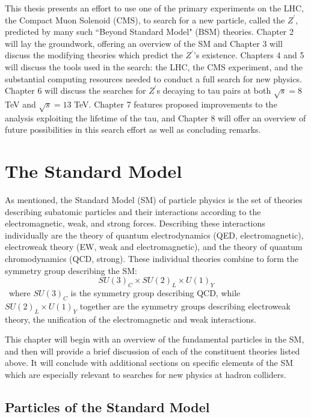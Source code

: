 This thesis presents an effort to use one of the primary experiments on the LHC, the Compact Muon Solenoid (CMS), to search for a new particle, called the \emph{$Z^\prime$}, predicted by many such ``Beyond Standard Model" (BSM) theories. Chapter 2 will lay the groundwork, offering an overview of the SM and Chapter 3 will discuss the modifying theories which predict the $Z^\prime$'s existence. Chapters 4 and 5 will discuss the tools used in the search: the LHC, the CMS experiment, and the substantial computing resources needed to conduct a full search for new physics. Chapter 6 will discuss the searches for $Z^\prime$s decaying to tau pairs at both $\sqrt{s} = 8$ TeV and $\sqrt{s} = 13$ TeV. Chapter 7 features proposed improvements to the analysis exploiting the lifetime of the tau, and Chapter 8 will offer an overview of future possibilities in this search effort as well as concluding remarks.
\clearpage

\chapter{The Standard Model}


As mentioned, the Standard Model (SM) of particle physics is the set of theories describing subatomic particles and their interactions according to the electromagnetic, weak, and strong forces. Describing these interactions individually are the theory of quantum electrodynamics (QED, electromagnetic), electroweak theory (EW, weak and electromagnetic), and the theory of quantum chromodynamics (QCD, strong). These individual theories combine to form the symmetry group describing the SM:
\begin{equation}
SU(3)_{C} \times SU(2)_{L} \times U(1)_{Y}
\end{equation}
\noindent\ where $SU(3)_{C}$ is the symmetry group describing QCD, while $SU(2)_{L} \times U(1)_{Y}$ together are the symmetry groups describing electroweak theory, the unification of the electromagnetic and weak interactions.

This chapter will begin with an overview of the fundamental particles in the SM, and then will provide a brief discussion of each of the constituent theories listed above. It will conclude with additional sections on specific elements of the SM which are especially relevant to searches for new physics at hadron colliders.

\section{Particles of the Standard Model}

